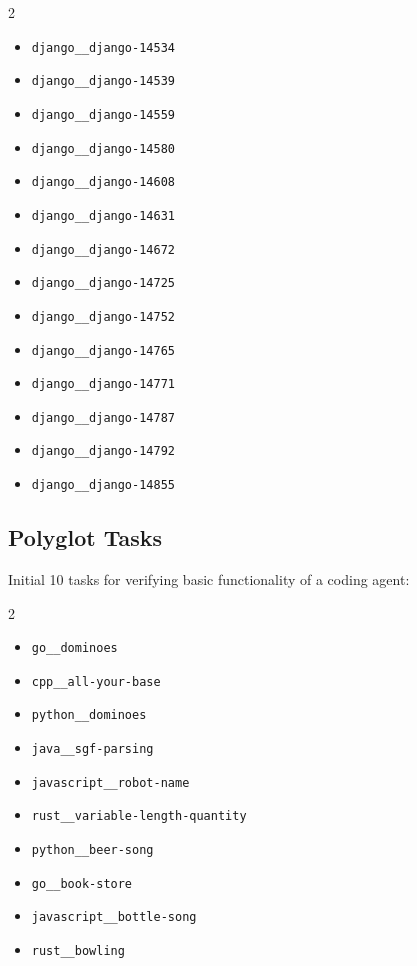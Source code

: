 \documentclass{article} %
\begin{document}
\begin{multicols}{2}
\begin{itemize}
    \item \texttt{django\_\_django-14534}
    \item \texttt{django\_\_django-14539}
    \item \texttt{django\_\_django-14559}
    \item \texttt{django\_\_django-14580}
    \item \texttt{django\_\_django-14608}
    \item \texttt{django\_\_django-14631}
    \item \texttt{django\_\_django-14672}
    \item \texttt{django\_\_django-14725}
    \item \texttt{django\_\_django-14752}
    \item \texttt{django\_\_django-14765}
    \item \texttt{django\_\_django-14771}
    \item \texttt{django\_\_django-14787}
    \item \texttt{django\_\_django-14792}
    \item \texttt{django\_\_django-14855}
\end{itemize}
\end{multicols}


\subsection{Polyglot Tasks}
\label{app:polyglot-tasks}

Initial 10 tasks for verifying basic functionality of a coding agent:

\begin{multicols}{2}
\begin{itemize}
    \item \texttt{go\_\_dominoes}
    \item \texttt{cpp\_\_all-your-base}
    \item \texttt{python\_\_dominoes}
    \item \texttt{java\_\_sgf-parsing}
    \item \texttt{javascript\_\_robot-name}
    \item \texttt{rust\_\_variable-length-quantity}
    \item \texttt{python\_\_beer-song}
    \item \texttt{go\_\_book-store}
    \item \texttt{javascript\_\_bottle-song}
    \item \texttt{rust\_\_bowling}
\end{itemize}
\end{multicols}
\end{document}

